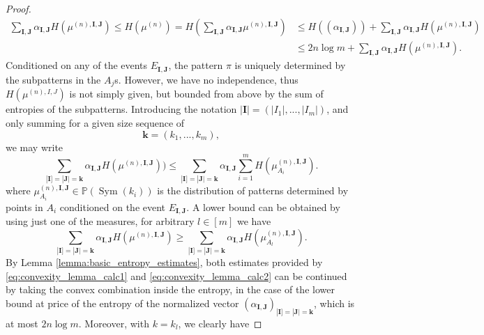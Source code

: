 \documentclass[11pt]{article}
\newcommand{\Sym}{\mathop{\mathrm{Sym}}}
\theoremstyle{definition}
\begin{document}
\begin{proof}
    \begin{equation} \label{eq:abs_cont_lem_entropy_bound}
    \begin{split}
    \sum_{\mathbf{I}, \mathbf{J}}\alpha_{\mathbf{I}, \mathbf{J}}H(\mu^{(n),\mathbf{I}, \mathbf{J}})\leq H(\mu^{(n)})=H\left(\sum_{\mathbf{I}, \mathbf{J}}\alpha_{\mathbf{I}, \mathbf{J}}\mu^{(n),\mathbf{I}, \mathbf{J}}\right)&\leq H((\alpha_{\mathbf{I}, \mathbf{J}}))+\sum_{\mathbf{I}, \mathbf{J}}\alpha_{\mathbf{I}, \mathbf{J}}H(\mu^{(n),\mathbf{I}, \mathbf{J}}) \\ &\leq 2n\log m + \sum_{\mathbf{I}, \mathbf{J}}\alpha_{\mathbf{I}, \mathbf{J}}H(\mu^{(n),\mathbf{I}, \mathbf{J}}).
    \end{split}
    \end{equation}
    Conditioned on any of the events $E_{\mathbf{I}, \mathbf{J}}$, the pattern $\pi$ is uniquely determined by the subpatterns in the $A_j$s. However, we have no independence, thus $H(\mu^{(n),I,J})$ is not simply given, but bounded from above by the sum of entropies of the subpatterns. Introducing the notation $|\mathbf{I}|=(|I_1|, ..., |I_m|)$, and only summing for a given size sequence of 
    $$\mathbf{k}=(k_1, ..., k_m),$$ 
    we may write
    \begin{equation}\label{eq:convexity_lemma_calc1}
    \sum_{|\mathbf{I}]=|\mathbf{J}|=\mathbf{k}}\alpha_{\mathbf{I}, \mathbf{J}}H(\mu^{(n),\mathbf{I}, \mathbf{J}}))\leq 
    \sum_{|\mathbf{I}]=|\mathbf{J}|=\mathbf{k}}\alpha_{\mathbf{I}, \mathbf{J}}\sum_{i=1}^m H(\mu_{A_i}^{(n),\mathbf{I}, \mathbf{J}}).
    \end{equation}
    where $\mu_{A_i}^{(n), \mathbf{I}, \mathbf{J}}\in \mathbb{P}(\Sym(k_i))$ is the distribution of patterns determined by points in $A_i$ conditioned on the event $E_{\mathbf{I}, \mathbf{J}}$. A lower bound can be obtained by using just one of the measures, for arbitrary $l\in [m]$ we have
    \begin{equation}\label{eq:convexity_lemma_calc2}
    \sum_{|\mathbf{I}]=|\mathbf{J}|=\mathbf{k}}\alpha_{\mathbf{I}, \mathbf{J}}H(\mu^{(n),\mathbf{I}, \mathbf{J}})\geq \sum_{|\mathbf{I}]=|\mathbf{J}|=\mathbf{k}}\alpha_{\mathbf{I}, \mathbf{J}} H(\mu_{A_l}^{(n),\mathbf{I}, \mathbf{J}}).
    \end{equation}
    By Lemma \ref{lemma:basic_entropy_estimates}, both estimates provided by \eqref{eq:convexity_lemma_calc1} and \eqref{eq:convexity_lemma_calc2} can be continued by taking the convex combination inside the entropy, in the case of the lower bound at price of the entropy of the normalized vector $\left(\alpha_{\mathbf{I}, \mathbf{J}}\right)_{|\mathbf{I}]=|\mathbf{J}|=\mathbf{k}}$, which is at most $2n \log m$. Moreover, with $k=k_l$, we clearly have

\end{proof}
\end{document}
